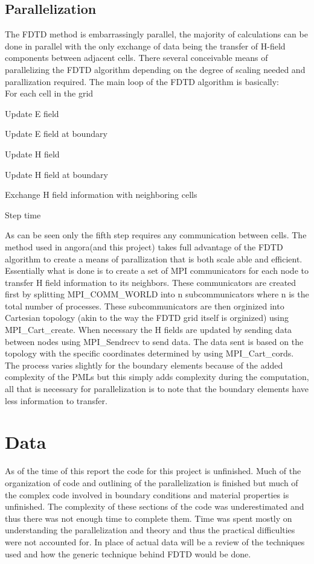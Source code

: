 \documentclass{article}
\begin{document}
\subsection{Parallelization}
The FDTD method is embarrassingly parallel, the majority of calculations can be
done in parallel with the only exchange of data being the transfer of H-field
components between adjacent cells. There several conceivable means of
parallelizing the FDTD algorithm depending on the degree of scaling needed  and
parallization required. The main loop of the FDTD algorithm is basically:\\
For each cell in the grid
\begin{enumerate*}
\item Update E field
\item Update E field at boundary
\item Update H field
\item Update H field at boundary
\item Exchange H field information with neighboring cells
\item Step time
\end{enumerate*}
As can be seen only the fifth step requires any communication between
cells. The method used in angora(and this project) takes full advantage of the
FDTD algorithm to create a means of parallization that is both scale able and
efficient. Essentially what is done is to create a set of MPI communicators for
each node to transfer H field information to its neighbors. These communicators
are created first by splitting MPI\_COMM\_WORLD into n subcommunicators where n
is the total number of processes. These subcommunicators are then orginized
into Cartesian topology (akin to the way the FDTD grid itself is orginized)
using MPI\_Cart\_create. When necessary the H fields are updated by sending
data between nodes using MPI\_Sendrecv to send data. The data sent is based on
the topology with the specific coordinates determined by using
MPI\_Cart\_cords. The process varies slightly for the boundary elements because
of the added complexity of the PMLs but this simply adds complexity during the
computation, all that is necessary for parallelization is to note that the
boundary elements have less information to transfer.

\section{Data}
As of the time of this report the code for this project is unfinished. Much of
the organization of code and outlining of the parallelization is finished but
much of the complex code involved in boundary conditions and material
properties is unfinished. The complexity of these sections of the code was
underestimated and thus there was not enough time to complete them. Time was
spent mostly on understanding the parallelization and theory and thus the
practical difficulties were not accounted for. In place of actual data will be
a review of the techniques used and how the generic technique behind FDTD would
be done.
\end{document}
